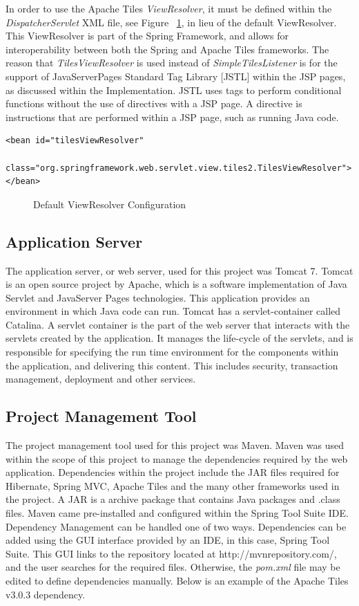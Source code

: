 In order to use the Apache Tiles \textit{ViewResolver}, it must be defined within the \textit{DispatcherServlet} XML file, see Figure ~\ref{fig:tilesViewRes}, in lieu of the default ViewResolver. This ViewResolver is part of the Spring Framework, and allows for interoperability between both the Spring and Apache Tiles frameworks. The reason that \textit{TilesViewResolver} is used instead of \textit{SimpleTilesListener} is for the support of JavaServerPages Standard Tag Library [JSTL] within the JSP pages, as discussed within the Implementation. JSTL uses tags to perform conditional functions without the use of directives with a JSP page. A directive is instructions that are performed within a JSP page, such as running Java code.\newpage

\begin{lstlisting}
<bean id="tilesViewResolver"
	class="org.springframework.web.servlet.view.tiles2.TilesViewResolver">
</bean>
\end{lstlisting}
\begin{figure}[H]
\caption{Default ViewResolver Configuration}
\label{fig:tilesViewRes}
\end{figure}

\subsection{Application Server}

The application server, or web server, used for this project was Tomcat 7.  Tomcat is an open source project by Apache, which is a software implementation of Java Servlet and JavaServer Pages technologies. This application provides an environment in which Java code can run. Tomcat has a servlet-container called Catalina. A servlet container is the part of the web server that interacts with the servlets created by the application. It manages the life-cycle of the servlets, and is responsible for specifying the run time environment for the components within the application, and delivering this content. This includes security, transaction management, deployment and other services. 

\subsection{Project Management Tool}

The project management tool used for this project was Maven. Maven was used within the scope of this project to manage the dependencies required by the web application. Dependencies within the project include the JAR files required for Hibernate, Spring MVC, Apache Tiles and the many other frameworks used in the project. A JAR is a archive package that contains Java packages and .class files. Maven came pre-installed and configured within the Spring Tool Suite IDE. Dependency Management can be handled one of two ways. Dependencies can be added using the GUI interface provided by an IDE, in this case, Spring Tool Suite. This GUI links to the repository located at http://mvnrepository.com/, and the user searches for the required files. Otherwise, the \textit{pom.xml} file may be edited to define dependencies manually. Below is an example of the Apache Tiles v3.0.3 dependency.

